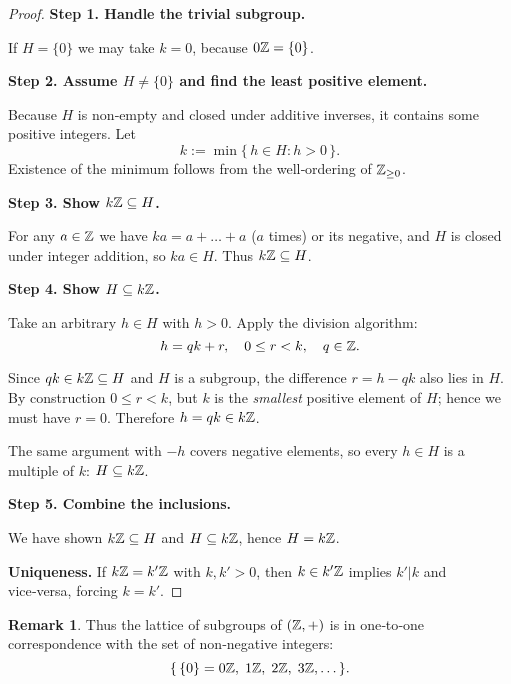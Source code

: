 \documentclass[12pt]{article}
\theoremstyle{definition} %
\newtheorem{remark}{Remark}
\theoremstyle{plain} %
\begin{document}
  \begin{proof}
  \textbf{Step 1.  Handle the trivial subgroup.}
  
  If \(H=\{0\}\) we may take \(k=0\), because \(0\Bbb Z=\{0\}\).
  
  \vspace{2ex}
  \textbf{Step 2.  Assume \(H\neq\{0\}\) and find the least positive element.}
  
  Because \(H\) is non‑empty and closed under additive inverses,
  it contains some positive integers.
  Let
  \[
        k := \min\bigl\{\,h\in H : h>0\,\bigr\}.
  \]
  Existence of the minimum follows from the well‑ordering of
  \(\Bbb Z_{\ge0}\).
  
  \vspace{2ex}
  \textbf{Step 3.  Show \(k\Bbb Z\subseteq H\).}
  
  For any \(a\in\Bbb Z\) we have \(ka = a\!+\!\dots+ a\)
  (\(a\) times) or its negative,
  and \(H\) is closed under integer addition,
  so \(ka\in H\).
  Thus \(k\Bbb Z\subseteq H\).
  
  \vspace{2ex}
  \textbf{Step 4.  Show \(H\subseteq k\Bbb Z\).}
  
  Take an arbitrary \(h\in H\) with \(h>0\).
  Apply the division algorithm:
  \[
        h = qk + r,
        \quad 0\le r < k,
        \quad q\in\Bbb Z.
  \]
  
  Since \(qk\in k\Bbb Z\subseteq H\) and \(H\) is a subgroup,
  the difference \(r = h - qk\) also lies in \(H\).
  By construction \(0\le r < k\), but \(k\) is the \emph{smallest}
  positive element of \(H\); hence we must have \(r=0\).
  Therefore \(h = qk\in k\Bbb Z\).
  
  The same argument with \(-h\) covers negative elements, so
  every \(h\in H\) is a multiple of \(k\):
  \(H\subseteq k\Bbb Z\).
  
  \vspace{2ex}
  \textbf{Step 5.  Combine the inclusions.}
  
  We have shown \(k\Bbb Z\subseteq H\) and \(H\subseteq k\Bbb Z\),
  hence \(H = k\Bbb Z\).
  
  \vspace{2ex}
  \textbf{Uniqueness.}
  If \(k\Bbb Z = k'\Bbb Z\) with \(k,k'>0\),
  then \(k\in k'\Bbb Z\) implies \(k'|k\) and vice‑versa,
  forcing \(k=k'\).
  \end{proof}
  
  \begin{remark}
  Thus the lattice of subgroups of \((\Bbb Z,+)\) is in one‑to‑one
  correspondence with the set of non‑negative integers:
  \[
        \{\,\{0\}=0\Bbb Z,\;1\Bbb Z,\;2\Bbb Z,\;3\Bbb Z,\dots\}.
  \]
  \end{remark}
\end{document}
